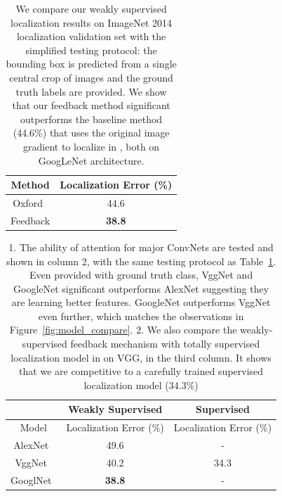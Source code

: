 \begin{table}[htb]
\centering
\small
\begin{tabular}{|c|c|}
\hline
Method & Localization Error (\%) \\ \hline
Oxford~\cite{simonyan2013deep} & 44.6 \\ \hline
Feedback & \textbf{38.8} \\ \hline
\end{tabular}
\caption{We compare our weakly supervised localization results on ImageNet 2014 {\color{red} localization} validation set with the simplified testing protocol: the bounding box is predicted from a single central crop of images and the ground truth labels are provided. We show that our feedback method significant outperforms the baseline method (44.6\%) that uses the original image gradient to localize {\color{red} in \cite{simonyan2013deep}, both on GoogLeNet architecture.}
}
\label{tab:localization_accuracy}
\end{table}

\begin{table}[htb]
\centering
\small
\begin{tabular}{c|c|c}
\hline
                                      & Weakly Supervised             & Supervised              \\ \hline
Model                                 & Localization Error (\%)       & Localization Error (\%) \\ \hline
AlexNet~\cite{Krizhevsky2012ImageNet} & 49.6                          & -                       \\ \hline
VggNet~\cite{Simonyan2014Very}        & 40.2                          & 34.3\cite{Simonyan2014Very} \\ \hline
GooglNet~\cite{Szegedy2014Going}      & \textbf{38.8}                 & - \\ \hline
\end{tabular}
\caption{{\color{red} 1. The ability of attention for major ConvNets are tested and shown in column 2, with the same testing protocol as Table~\ref{tab:localization_accuracy}}. Even provided with ground truth class, VggNet and GoogleNet significant outperforms AlexNet suggesting they are learning better features. GoogleNet outperforms VggNet even further, which matches the observations in Figure~\ref{fig:model_compare}. {\color{red} 2. We also compare the weakly-supervised feedback mechanism with totally supervised localization model in \cite{Simonyan2014Very} on VGG, in the third column. It shows that we are competitive to a carefully trained supervised localization model (34.3\%) }}
\label{tab:localization_model_compare}
\end{table}

